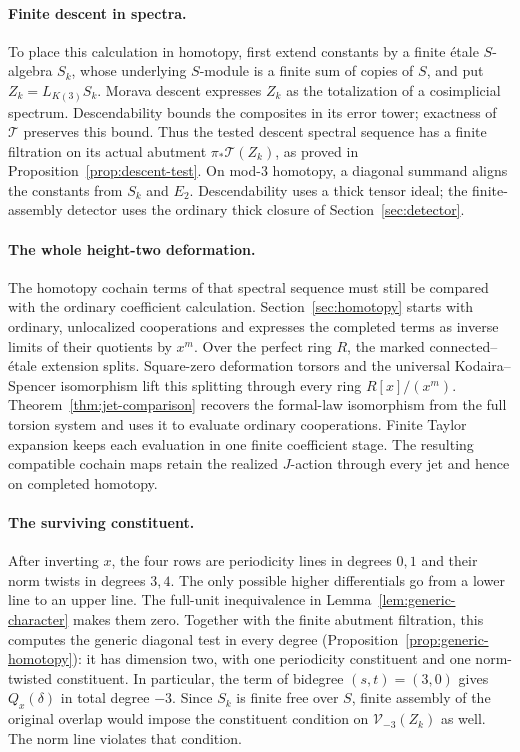 \paragraph{Finite descent in spectra.}
To place this calculation in homotopy, first extend constants by a finite
\'etale \(S\)-algebra \(S_k\), whose underlying \(S\)-module is a finite
sum of copies of \(S\), and put \(Z_k=L_{K(3)}S_k\). Morava descent
expresses \(Z_k\) as the totalization of a cosimplicial spectrum.
Descendability \citep{Mathew16} bounds the composites in its error tower;
exactness of \(\mathcal T\) preserves this bound. Thus the tested descent
spectral sequence has a finite filtration on its actual abutment
\(\pi_*\mathcal T(Z_k)\), as proved in
Proposition~\ref{prop:descent-test}. On mod-\(3\) homotopy, a diagonal
summand aligns the constants from \(S_k\) and \(E_2\). Descendability
uses a thick tensor ideal; the finite-assembly detector uses the ordinary
thick closure of Section~\ref{sec:detector}.

\paragraph{The whole height-two deformation.}
The homotopy cochain terms of that spectral sequence must still be compared with
the ordinary coefficient calculation. Section~\ref{sec:homotopy} starts
with ordinary, unlocalized cooperations and expresses the completed terms
as inverse limits of their quotients by \(x^m\). Over the perfect ring
\(R\), the marked connected--\'etale extension splits. Square-zero
deformation torsors and the universal Kodaira--Spencer isomorphism
\citep[Section~5, especially Theorem~5.1 and the paragraph following
Equation~(5.2)]{Lau10} lift this splitting through
every ring \(R[x]/(x^m)\). Theorem~\ref{thm:jet-comparison} recovers the
formal-law isomorphism from the full torsion system and uses it to
evaluate ordinary cooperations. Finite Taylor expansion keeps each
evaluation in one finite coefficient stage. The resulting compatible
cochain maps retain the realized \(J\)-action through every jet and hence
on completed homotopy.

\paragraph{The surviving constituent.}
After inverting \(x\), the four rows are periodicity lines in degrees
\(0,1\) and their norm twists in degrees \(3,4\). The only possible
higher differentials go from a lower line to an upper line. The full-unit
inequivalence in Lemma~\ref{lem:generic-character} makes them zero.
Together with the finite abutment filtration, this computes the generic
diagonal test in every degree
(Proposition~\ref{prop:generic-homotopy}): it has dimension two, with one periodicity
constituent and one norm-twisted constituent. In particular, the term of
bidegree \((s,t)=(3,0)\) gives \(Q_x(\delta)\) in total degree \(-3\).
Since \(S_k\) is finite free over \(S\), finite assembly of the original
overlap would impose the constituent condition on \(\mathcal V_{-3}(Z_k)\)
as well. The norm line violates that condition.

